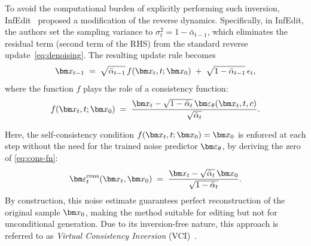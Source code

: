 To avoid the computational burden of explicitly performing such inversion, InfEdit~\cite{infedit} proposed a modification of the reverse dynamics. Specifically, in InfEdit, the authors set the sampling variance to $\sigma_t^2 = 1-\bar\alpha_{t-1}$, which eliminates the residual term (second term of the RHS) from the standard reverse update~\cref{eq:denoising}. The resulting update rule becomes
\begin{align}
    \x_{t-1} \;=\; \sqrt{\bar\alpha_{t-1}}\,f(\x_t,t;\x_0) \;+\; \sqrt{1-\bar\alpha_{t-1}}\,\epsilon_t, 
\end{align}
where the function $f$ plays the role of a consistency function:
\begin{align}\label{eq:cons-fn}
    f(\x_t,t;\x_0) \;=\; \frac{\x_t - \sqrt{1-\bar\alpha_t}\,\eps_\theta(\x_t,t,c)}{\sqrt{\bar\alpha_t}}.
\end{align}

Here, the self-consistency condition $f(\x_t,t;\x_0)=\x_0$ is enforced at each step without the need for the trained noise predictor $\eps_\theta$, by deriving the zero of \cref{eq:cons-fn}:
\begin{align}
    \eps_t^{\mathrm{cons}}(\x_t, \x_0) \;=\; \frac{\x_t - \sqrt{\bar\alpha_t}\,\x_0}{\sqrt{1-\bar\alpha_t}}.
\end{align}
By construction, this noise estimate guarantees perfect reconstruction of the original sample $\x_0$, making the method suitable for editing but not for unconditional generation. Due to its inversion-free nature, this approach is referred to as \emph{Virtual Consistency Inversion} (VCI)~\cite{infedit}.

